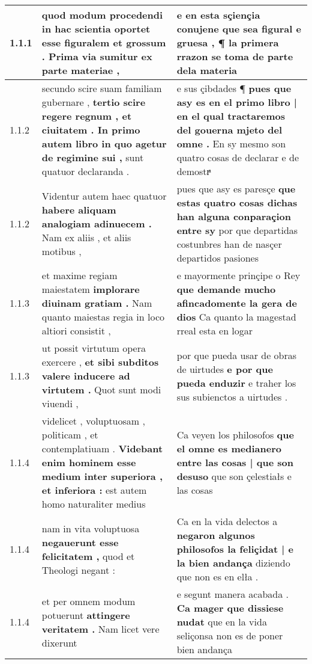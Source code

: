 \begin{tabular}{|p{1cm}|p{6.5cm}|p{6.5cm}|}

\hline
1.1.1 & quod modum procedendi in hac scientia oportet \textbf{ esse figuralem et grossum . } Prima via sumitur ex parte materiae , & e en esta sçiençia conujene \textbf{ que sea figural e gruesa , } ¶ la primera rrazon se toma de parte dela materia \\\hline
1.1.2 & secundo scire suam familiam gubernare , \textbf{ tertio scire regere regnum , et ciuitatem . In primo autem libro in quo agetur de regimine sui , } sunt quatuor declaranda . & e sus çibdades ¶ \textbf{ pues que asy es en el primo libro | en el qual tractaremos del gouerna mjeto del omne . } En sy mesmo son quatro cosas de declarar e de demostrͣ \\\hline
1.1.2 & Videntur autem haec quatuor \textbf{ habere aliquam analogiam adinuecem . } Nam ex aliis , et aliis motibus , & pues que asy es paresçe \textbf{ que estas quatro cosas dichas han alguna conparaçion entre sy } por que departidas costunbres han de nasçer departidos pasiones \\\hline
1.1.3 & et maxime regiam maiestatem \textbf{ implorare diuinam gratiam . } Nam quanto maiestas regia in loco altiori consistit , & e mayormente prinçipe o Rey \textbf{ que demande mucho afincadomente la gera de dios } Ca quanto la magestad rreal esta en logar \\\hline
1.1.3 & ut possit virtutum opera exercere , \textbf{ et sibi subditos valere inducere ad virtutem . } Quot sunt modi viuendi , & por que pueda usar de obras de uirtudes \textbf{ e por que pueda enduzir } e traher los sus subienctos a uirtudes . \\\hline
1.1.4 & videlicet , voluptuosam , politicam , et contemplatiuam . \textbf{ Videbant enim hominem esse medium inter superiora , et inferiora : } est autem homo naturaliter medius & Ca veyen los philosofos \textbf{ que el omne es medianero entre las cosas | que son desuso } que son çelestiałs e las cosas \\\hline
1.1.4 & nam in vita voluptuosa \textbf{ negauerunt esse felicitatem , } quod et Theologi negant : & Ca en la vida delectos a \textbf{ negaron algunos philosofos la feliçidat | e la bien andança } diziendo que non es en elła . \\\hline
1.1.4 & et per omnem modum potuerunt \textbf{ attingere veritatem . } Nam licet vere dixerunt & e segunt manera acabada . \textbf{ Ca mager que dissiese nudat } que en la vida seliçonsa non es de poner bien andança \\\hline

\end{tabular}
